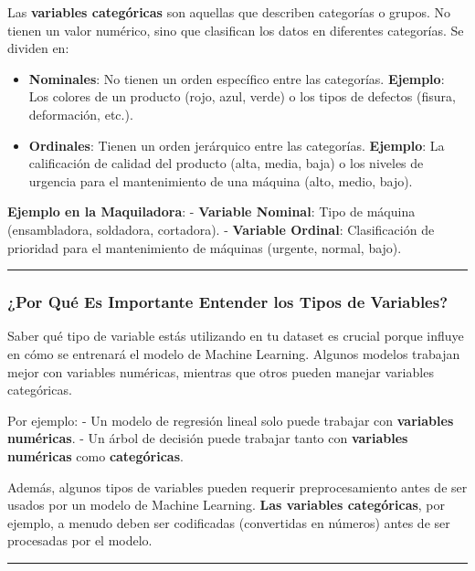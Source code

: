 \documentclass[
  10pt,
  letterpaper,
]{book}
\begin{document}
Las \textbf{variables categóricas} son aquellas que describen categorías
o grupos. No tienen un valor numérico, sino que clasifican los datos en
diferentes categorías. Se dividen en:

\begin{itemize}
\item
  \textbf{Nominales}: No tienen un orden específico entre las
  categorías. \textbf{Ejemplo}: Los colores de un producto (rojo, azul,
  verde) o los tipos de defectos (fisura, deformación, etc.).
\item
  \textbf{Ordinales}: Tienen un orden jerárquico entre las categorías.
  \textbf{Ejemplo}: La calificación de calidad del producto (alta,
  media, baja) o los niveles de urgencia para el mantenimiento de una
  máquina (alto, medio, bajo).
\end{itemize}

\textbf{Ejemplo en la Maquiladora}: - \textbf{Variable Nominal}: Tipo de
máquina (ensambladora, soldadora, cortadora). - \textbf{Variable
Ordinal}: Clasificación de prioridad para el mantenimiento de máquinas
(urgente, normal, bajo).

\begin{center}\rule{0.5\linewidth}{0.5pt}\end{center}

\subsubsection{¿Por Qué Es Importante Entender los Tipos de
Variables?}\label{por-quuxe9-es-importante-entender-los-tipos-de-variables}

Saber qué tipo de variable estás utilizando en tu dataset es crucial
porque influye en cómo se entrenará el modelo de Machine Learning.
Algunos modelos trabajan mejor con variables numéricas, mientras que
otros pueden manejar variables categóricas.

Por ejemplo: - Un modelo de regresión lineal solo puede trabajar con
\textbf{variables numéricas}. - Un árbol de decisión puede trabajar
tanto con \textbf{variables numéricas} como \textbf{categóricas}.

Además, algunos tipos de variables pueden requerir preprocesamiento
antes de ser usados por un modelo de Machine Learning. \textbf{Las
variables categóricas}, por ejemplo, a menudo deben ser codificadas
(convertidas en números) antes de ser procesadas por el modelo.

\begin{center}\rule{0.5\linewidth}{0.5pt}\end{center}
\end{document}
